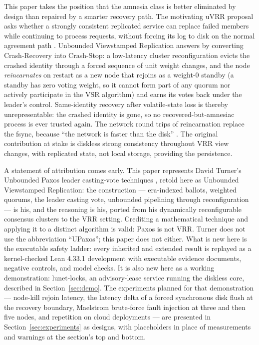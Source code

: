 \documentclass[10pt,journal,letterpaper]{IEEEtran}
\begin{document}
This paper takes the position that the amnesia class is better eliminated by
design than repaired by a smarter recovery path. The motivating uVRR proposal
asks whether a strongly consistent replicated service can replace failed
members while continuing to process requests, without forcing its log to disk
on the normal agreement path \cite{uvrr}. Unbounded Viewstamped Replication
answers by converting Crash-Recovery into Crash-Stop: a low-latency cluster
reconfiguration evicts the crashed identity through a forced sequence of
unit weight changes, and the node \emph{reincarnates} on restart as a new
node that rejoins as a weight-0 standby (a standby has zero voting weight, so
it cannot form part of any quorum nor actively participate in the VSR
algorithm) and earns its votes back under the leader's control. Same-identity
recovery after volatile-state loss is thereby unrepresentable: the crashed
identity is gone, so no recovered-but-amnesiac process is ever trusted again.
The network round trips of reincarnation replace the fsync, because ``the
network is faster than the disk'' \cite{netdisk}. The original contribution at
stake is diskless strong consistency throughout VRR view changes, with
replicated state, not local storage, providing the persistence.

A statement of attribution comes early. This paper represents David Turner's
Unbounded Paxos leader casting-vote techniques \cite{turner}, retold here as
Unbounded Viewstamped Replication: the construction --- era-indexed ballots,
weighted quorums, the leader casting vote, unbounded pipelining through
reconfiguration --- is his, and the reasoning is his, ported from his
dynamically reconfigurable consensus clusters to the VRR setting. Crediting a
mathematical technique and applying it to a distinct algorithm is valid: Paxos
is not VRR. Turner does
not use the abbreviation ``UPaxos''; this paper does not either. What is new
here is the executable safety ladder: every inherited and extended result is
replayed as a kernel-checked Lean 4.33.1 development with executable evidence
documents, negative controls, and model checks. It is also new here as a
working demonstration: lunet-locks, an advisory-lease service running the
diskless core, described in Section~\ref{sec:demo}. The experiments planned
for that demonstration --- node-kill rejoin latency, the latency delta of a
forced synchronous disk flush at the recovery boundary, Maelstrom
brute-force fault injection at three and then five nodes, and repetition on
cloud deployments --- are presented in Section~\ref{sec:experiments} as designs,
with placeholders in place of measurements and warnings at the section's top
and bottom.
\end{document}
